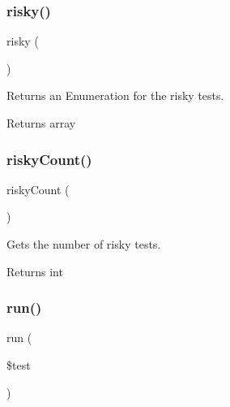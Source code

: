 \subsubsection{\texorpdfstring{risky()}{risky()}}
{\footnotesize\ttfamily risky (\begin{DoxyParamCaption}{ }\end{DoxyParamCaption})}

Returns an Enumeration for the risky tests.

\begin{DoxyReturn}{Returns}
array 
\end{DoxyReturn}
\mbox{\label{class_p_h_p_unit___framework___test_result_aae72562b9950775acd98b2426f3ae042}} 
\subsubsection{\texorpdfstring{risky\+Count()}{riskyCount()}}
{\footnotesize\ttfamily risky\+Count (\begin{DoxyParamCaption}{ }\end{DoxyParamCaption})}

Gets the number of risky tests.

\begin{DoxyReturn}{Returns}
int 
\end{DoxyReturn}
\mbox{\label{class_p_h_p_unit___framework___test_result_abb4583d5b3f6dbe088384b34c723d17d}} 
\subsubsection{\texorpdfstring{run()}{run()}}
{\footnotesize\ttfamily run (\begin{DoxyParamCaption}\item[{\mbox{\hyperlink{interface_p_h_p_unit___framework___test}{P\+H\+P\+Unit\+\_\+\+Framework\+\_\+\+Test}}}]{\$test }\end{DoxyParamCaption})}

